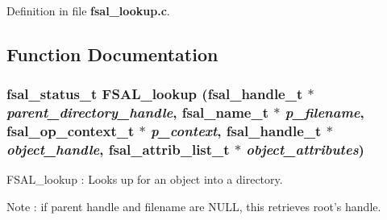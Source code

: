 Definition in file {\bf fsal\_\-lookup.c}.

\subsection{Function Documentation}
\subsubsection[{FSAL\_\-lookup}]{\setlength{\rightskip}{0pt plus 5cm}fsal\_\-status\_\-t FSAL\_\-lookup (fsal\_\-handle\_\-t $\ast$ {\em parent\_\-directory\_\-handle}, \/  fsal\_\-name\_\-t $\ast$ {\em p\_\-filename}, \/  fsal\_\-op\_\-context\_\-t $\ast$ {\em p\_\-context}, \/  fsal\_\-handle\_\-t $\ast$ {\em object\_\-handle}, \/  fsal\_\-attrib\_\-list\_\-t $\ast$ {\em object\_\-attributes})}\label{fsal__lookup_8c_91f6a1280bdfb73e46baebd950bd6c99}


FSAL\_\-lookup : Looks up for an object into a directory.

Note : if parent handle and filename are NULL, this retrieves root's handle.

